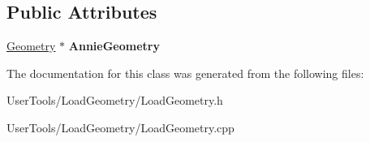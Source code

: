 \subsection*{Public Attributes}
\begin{DoxyCompactItemize}
\item 
\hypertarget{classLoadGeometry_aaff5bd699a7b7d480adcdafde405360d}{\hyperlink{classGeometry}{Geometry} $\ast$ {\bfseries Annie\-Geometry}}\label{classLoadGeometry_aaff5bd699a7b7d480adcdafde405360d}

\end{DoxyCompactItemize}


The documentation for this class was generated from the following files\-:\begin{DoxyCompactItemize}
\item 
User\-Tools/\-Load\-Geometry/Load\-Geometry.\-h\item 
User\-Tools/\-Load\-Geometry/Load\-Geometry.\-cpp\end{DoxyCompactItemize}
